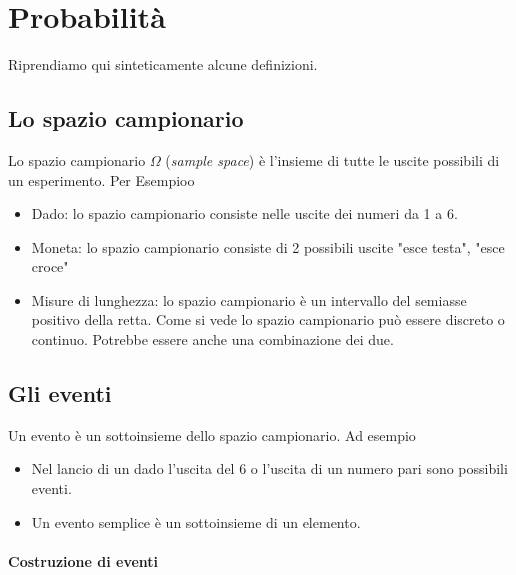 \documentclass[onecolumn,12pt]{book}\usepackage[]{graphicx}\usepackage[]{color}
\author{Federico Comoglio e  Maurizio Rinaldi}
\begin{document}



\markright{\today}
\thispagestyle{empty}
\maketitle
\newpage
\thispagestyle{empty}
\tableofcontents
\newpage
\thispagestyle{empty}
 \mainmatter

 

 
 
\chapter{Probabilit\`a}
Riprendiamo qui sinteticamente alcune definizioni.
\section{Lo spazio campionario}

Lo spazio campionario $\Omega$  (\emph{sample space}) è l'insieme di tutte le uscite possibili di un esperimento. Per Esempioo 
\begin{itemize}
\item Dado: lo spazio campionario consiste nelle uscite dei numeri da 1 a 6. \item Moneta: lo spazio campionario consiste di 2 possibili  uscite "esce testa", "esce croce"
\item Misure di lunghezza: lo spazio campionario è un intervallo del semiasse positivo della retta. 
Come si vede lo spazio campionario pu\`o essere discreto o continuo. Potrebbe essere anche una combinazione dei due.
\end{itemize}
\section{Gli eventi}


 Un evento è un sottoinsieme dello spazio campionario. 
 Ad esempio
\begin{itemize}
\item Nel lancio di un dado l'uscita del 6 o l'uscita di un numero pari sono possibili eventi. 
\item Un evento semplice è un sottoinsieme di un elemento.
\end{itemize}


\subsubsection{Costruzione di eventi}
\end{document}
